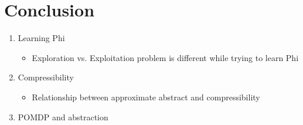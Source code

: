 \documentclass{article}
\begin{document}
\section{Conclusion}


\begin{enumerate}
\item Learning Phi
\begin{itemize}
\item Exploration vs. Exploitation problem is different while trying to learn Phi
\end{itemize}
\item Compressibility
\begin{itemize}
\item Relationship between approximate abstract and compressibility
\end{itemize}
\item POMDP and abstraction
\end{enumerate}







\end{document}
